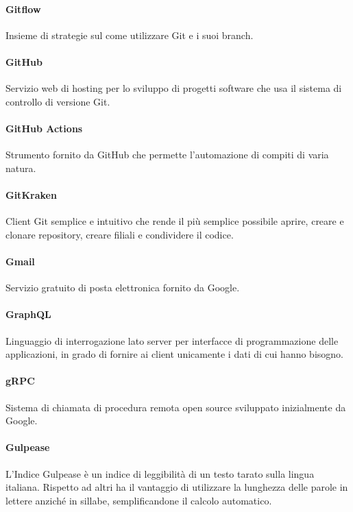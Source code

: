 \documentclass[]{article}
\begin{document}
	\paragraph*{Gitflow}
	Insieme di strategie sul come utilizzare Git e i suoi branch.

	\paragraph*{GitHub}
	Servizio web di hosting per lo sviluppo di progetti software che usa il sistema di controllo di versione Git.

	\paragraph*{GitHub Actions}
	Strumento fornito da GitHub che permette l’automazione di compiti di varia natura.

	\paragraph*{GitKraken}
	Client Git semplice e intuitivo che rende il più semplice possibile aprire, creare e clonare repository, creare filiali e condividere il codice.

	\paragraph*{Gmail}
	Servizio gratuito di posta elettronica fornito da Google.

	\paragraph*{GraphQL}
	Linguaggio di interrogazione lato server per interfacce di programmazione delle applicazioni, in grado di fornire ai client unicamente i dati di cui hanno bisogno.

	\paragraph*{gRPC}
	Sistema di chiamata di procedura remota open source sviluppato inizialmente da Google.

	\paragraph*{Gulpease}
	L'Indice Gulpease è un indice di leggibilità di un testo tarato sulla lingua italiana. Rispetto ad altri ha il vantaggio di utilizzare la lunghezza delle parole in lettere anziché in sillabe, semplificandone il calcolo automatico.
\end{document}
